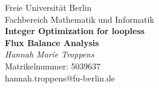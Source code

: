 \begin{titlepage}
\thispagestyle{empty}
\newcommand{\HRule}{\rule{\linewidth}{0.5mm}}
\hspace{1cm}
\center

{\huge Freie Universität Berlin}\\[1.0cm]
{\Large Fachbereich Mathematik und Informatik}\\[0.8cm]



{ \huge \bfseries Integer Optimization for loopless \\ Flux Balance Analysis }\\[4cm]
{\textit{Hannah Marie Troppens}}\\
{Matrikelnummer: 5039637}\\
{hannah.troppens@fu-berlin.de}\\[1cm]

\vspace{1cm}
\myformat{\today}
\end{titlepage}
\restoregeometry

